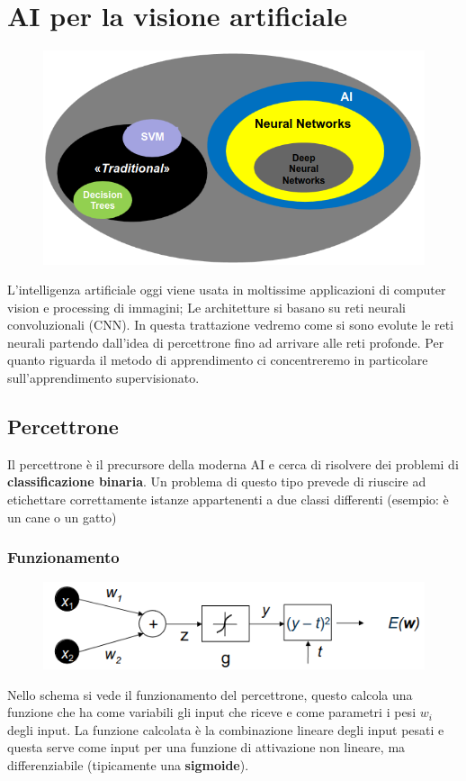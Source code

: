 \chapter{AI per la visione artificiale}
\begin{figure}
	\vspace{-.5cm}
	\centering
	\includegraphics[width=.9\linewidth]{Picture/AI_Classes}
\end{figure}
L'intelligenza artificiale oggi viene usata in moltissime applicazioni di computer vision e processing di immagini; Le architetture si basano su reti neurali convoluzionali (CNN). In questa trattazione vedremo come si sono evolute le reti neurali partendo dall'idea di percettrone fino ad arrivare alle reti profonde. Per quanto riguarda il metodo di apprendimento ci concentreremo in particolare sull'apprendimento supervisionato.

\section{Percettrone}
Il percettrone è il precursore della moderna AI e cerca di risolvere dei problemi di \textbf{classificazione binaria}. Un problema di questo tipo prevede di riuscire ad etichettare correttamente istanze appartenenti a due classi differenti (esempio: è un cane o un gatto)

\subsection{Funzionamento}
\begin{figure}
	\vspace{-.2cm}
	\centering
	\includegraphics[width=.9\linewidth]{Picture/Perceptron}
\end{figure}
Nello schema si vede il funzionamento del percettrone, questo calcola una funzione che ha come variabili gli input che riceve e come parametri i pesi $w_i$ degli input. La funzione calcolata è la combinazione lineare degli input pesati e questa serve come input per una funzione di attivazione non lineare, ma differenziabile (tipicamente una \textbf{sigmoide}).
